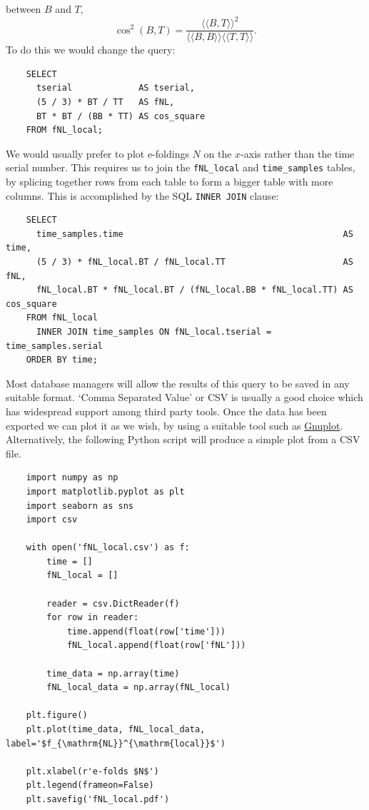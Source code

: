 \documentclass[11pt,a4paper]{article}
\newcommand{\iprod}[2]{\langle\!\langle {#1}, {#2} \rangle\!\rangle}
\begin{document}
between $B$ and $T$,
\begin{equation}
    \cos^2 (B,T) = \frac{\iprod{B}{T}^2}{\iprod{B}{B} \iprod{T}{T}} .
\end{equation}
To do this we would change the query:
\begin{verbatim}
    SELECT
      tserial             AS tserial,
      (5 / 3) * BT / TT   AS fNL,
      BT * BT / (BB * TT) AS cos_square
    FROM fNL_local;    
\end{verbatim}
We would usually prefer to plot e-foldings $N$ on the $x$-axis rather than the
time serial number.
This requires us to join the
\texttt{fNL_local} and
\texttt{time_samples} tables,
by splicing together rows from each table
to form a bigger table with more columns.
This is accomplished by the SQL
\texttt{INNER JOIN} clause:
\begin{verbatim}
    SELECT
      time_samples.time                                           AS time,
      (5 / 3) * fNL_local.BT / fNL_local.TT                       AS fNL,
      fNL_local.BT * fNL_local.BT / (fNL_local.BB * fNL_local.TT) AS cos_square
    FROM fNL_local
      INNER JOIN time_samples ON fNL_local.tserial = time_samples.serial
    ORDER BY time;
\end{verbatim}
Most database managers will allow the results of this query to be saved
in any suitable format.
`Comma Separated Value' or CSV is usually a good choice which has
widespread support among third party tools.
Once the data has been exported we can plot it as we wish,
by using a suitable tool such as
\href{http://www.gnuplot.info}{Gnuplot}.
Alternatively, the following Python script will produce a simple plot
from a CSV file.
\begin{verbatim}
    import numpy as np
    import matplotlib.pyplot as plt
    import seaborn as sns
    import csv
    
    with open('fNL_local.csv') as f:
        time = []
        fNL_local = []
    
        reader = csv.DictReader(f)
        for row in reader:
            time.append(float(row['time']))
            fNL_local.append(float(row['fNL']))
    
        time_data = np.array(time)
        fNL_local_data = np.array(fNL_local)
    
    plt.figure()
    plt.plot(time_data, fNL_local_data, label='$f_{\mathrm{NL}}^{\mathrm{local}}$')
    
    plt.xlabel(r'e-folds $N$')
    plt.legend(frameon=False)
    plt.savefig('fNL_local.pdf')    
\end{verbatim}
\end{document}
